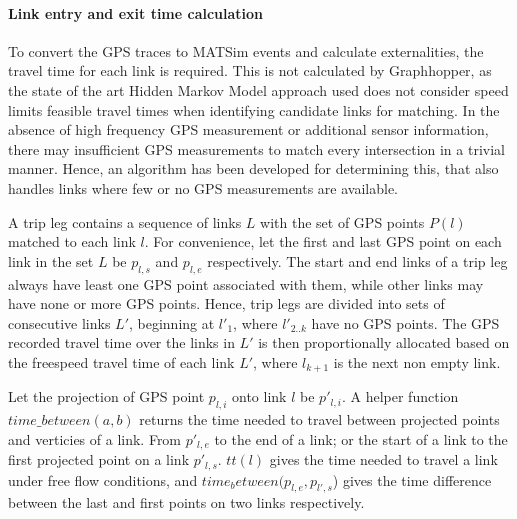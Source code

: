 \paragraph{Link entry and exit time calculation}
To convert the GPS traces to MATSim events and calculate externalities, the travel time for each link is required.
This is not calculated by Graphhopper, as the state of the art Hidden Markov Model approach used \citep{newson2009hidden} does not consider speed limits feasible travel times when identifying candidate links for matching.
In the absence of high frequency GPS measurement or additional sensor information, there may insufficient GPS measurements to match every intersection in a trivial manner. Hence, an algorithm has been developed for determining this, that also handles links where few or no GPS measurements are available.

A trip leg contains a sequence of links $L$ with the set of GPS points $P(l)$ matched to each link $l$. For convenience, let the first and last GPS point on each link in the set $L$ be $p_{l,s}$ and $p_{l,e}$ respectively.
The start and end links of a trip leg always have least one GPS point associated with them, while other links may have none or more GPS points.
Hence, trip legs are divided into sets of consecutive links  $L'$, beginning at $l'_1$,  where $l'_{2..k}$ have no GPS points. The GPS recorded travel time over the links in $L'$ is then proportionally allocated based on the freespeed travel time of each link $L'$, where $l_{k+1}$ is the next non empty link.

Let the projection of GPS point $p_{l,i}$ onto link $l$ be $p'_{l,i}$.
A helper function $time\_between(a,b)$ returns the time needed to travel between projected points and verticies of a link. From $p'_{l,e}$ to the end of a link; or the start of a link to the first projected point on a link $p'_{l,s}$.
$tt(l)$ gives the time needed to travel a link under free flow conditions, and $time_between(p_{l,e}, p_{l',s}$) gives the time difference between the last and first points on two links respectively.

